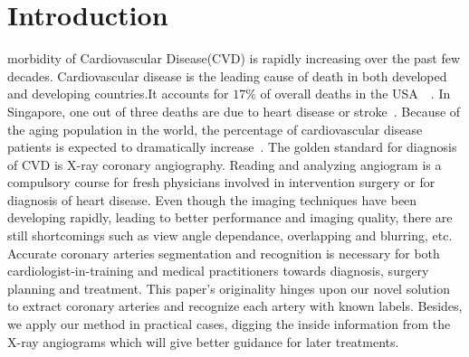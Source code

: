 \documentclass[journal]{IEEEtran}
\begin{document}
%
\IEEEpeerreviewmaketitle



\section{Introduction}
%
%
%
%
 morbidity of Cardiovascular Disease(CVD) is rapidly increasing over the past few decades. Cardiovascular disease is the leading cause of death in both developed and developing countries.It accounts for $17\%$ of overall deaths in the USA~\cite{heidenreich2011forecasting}~\cite{roger2011aha}. In Singapore, one out of three deaths are due to heart disease or stroke~\cite{Registry2012sigapore}. Because of the aging population in the world, the percentage of cardiovascular disease patients is expected to dramatically increase~\cite{heys2010revisiting}. The golden standard for diagnosis of CVD is X-ray coronary angiography. Reading and analyzing angiogram is a compulsory course for fresh physicians involved in intervention surgery or for diagnosis of heart disease. Even though the imaging techniques have been developing rapidly, leading to better performance and imaging quality, there are still shortcomings such as view angle dependance, overlapping and blurring, etc. Accurate coronary arteries segmentation and recognition is necessary for both cardiologist-in-training and medical practitioners towards diagnosis, surgery planning and treatment. This paper's originality hinges upon our novel solution to extract coronary arteries and recognize each artery with known labels. Besides, we apply our method in practical cases, digging the inside information from the X-ray angiograms which will give better guidance for later treatments.
\end{document}
